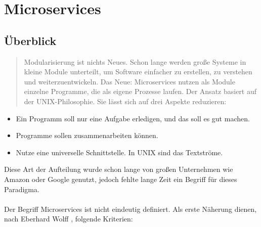 \chapter{Microservices}
\label{chap:Microservices}

\section{Überblick}
\label{sec:überblickMicroservice}
\begin{quotation}
    \frqq Modularisierung ist nichts Neues. Schon lange werden große Systeme in kleine Module unterteilt, um Software einfacher zu erstellen, zu verstehen und weiterzuentwickeln. Das Neue: Microservices nutzen als Module einzelne Programme, die als eigene Prozesse laufen. Der Ansatz basiert auf der UNIX-Philosophie. Sie lässt sich auf drei Aspekte reduzieren:\flqq\cite[S. 2]{EWolff2016:Microservices}
\end{quotation}


\begin{itemize}
    \item Ein Programm soll nur eine Aufgabe erledigen, und das soll es gut machen.
    \item Programme sollen zusammenarbeiten können.
    \item Nutze eine universelle Schnittstelle. In UNIX sind das Textströme.
\end{itemize}
Diese Art der Aufteilung wurde schon lange von großen Unternehmen wie Amazon oder Google genutzt, jedoch fehlte lange Zeit ein Begriff für dieses Paradigma.
\\\\
Der Begriff Microservices ist nicht eindeutig definiert. Als erste Näherung dienen, nach Eberhard Wolff \cite[S. 2]{EWolff2016:Microservices}, folgende Kriterien:

